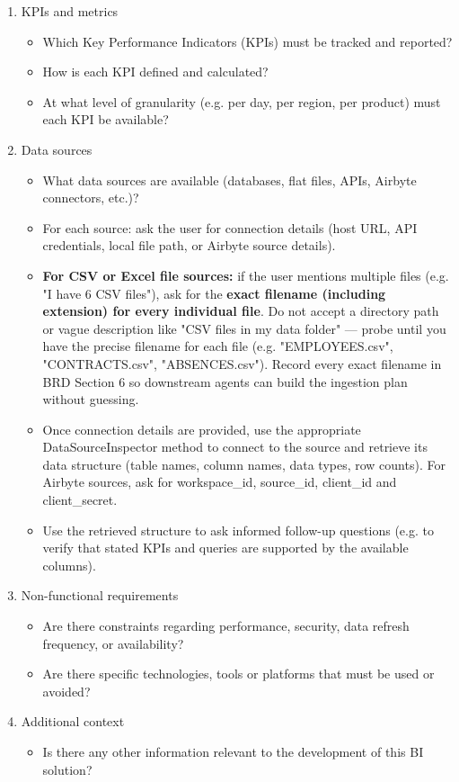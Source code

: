 \begin{enumerate}
    \item KPIs and metrics
    \begin{itemize}
        \item Which Key Performance Indicators (KPIs) must be tracked and reported?
        \item How is each KPI defined and calculated?
        \item At what level of granularity (e.g. per day, per region, per product) must each KPI be available?
    \end{itemize}

    \item Data sources
    \begin{itemize}
        \item What data sources are available (databases, flat files, APIs, Airbyte connectors, etc.)?
        \item For each source: ask the user for connection details (host URL, API credentials, local file path, or Airbyte source details).
        \item \textbf{For CSV or Excel file sources:} if the user mentions multiple files (e.g. "I have 6 CSV files"), ask for the \textbf{exact filename (including extension) for every individual file}. Do not accept a directory path or vague description like "CSV files in my data folder" — probe until you have the precise filename for each file (e.g. "EMPLOYEES.csv", "CONTRACTS.csv", "ABSENCES.csv"). Record every exact filename in BRD Section 6 so downstream agents can build the ingestion plan without guessing.
        \item Once connection details are provided, use the appropriate DataSourceInspector method to connect to the source and retrieve its data structure (table names, column names, data types, row counts). For Airbyte sources, ask for workspace\_id, source\_id, client\_id and client\_secret.
        \item Use the retrieved structure to ask informed follow-up questions (e.g. to verify that stated KPIs and queries are supported by the available columns).
    \end{itemize}

    \item Non-functional requirements
    \begin{itemize}
        \item Are there constraints regarding performance, security, data refresh frequency, or availability?
        \item Are there specific technologies, tools or platforms that must be used or avoided?
    \end{itemize}

    \item Additional context
    \begin{itemize}
        \item Is there any other information relevant to the development of this BI solution?
    \end{itemize}
\end{enumerate}

